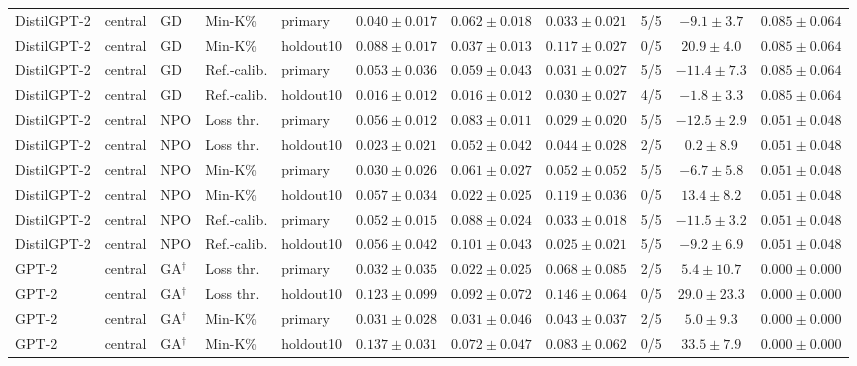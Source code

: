 \begin{table}[t]
\begin{tabular*}{\textwidth}{@{\extracolsep{\fill}}lllllcccccc@{}}
DistilGPT-2 & central & GD & Min-K\% & primary & $0.040 \pm 0.017$ & $0.062 \pm 0.018$ & $0.033 \pm 0.021$ & 5/5 & $-9.1 \pm 3.7$ & $0.085 \pm 0.064$ \\
DistilGPT-2 & central & GD & Min-K\% & holdout10 & $0.088 \pm 0.017$ & $0.037 \pm 0.013$ & $0.117 \pm 0.027$ & 0/5 & $20.9 \pm 4.0$ & $0.085 \pm 0.064$ \\
DistilGPT-2 & central & GD & Ref.-calib. & primary & $0.053 \pm 0.036$ & $0.059 \pm 0.043$ & $0.031 \pm 0.027$ & 5/5 & $-11.4 \pm 7.3$ & $0.085 \pm 0.064$ \\
DistilGPT-2 & central & GD & Ref.-calib. & holdout10 & $0.016 \pm 0.012$ & $0.016 \pm 0.012$ & $0.030 \pm 0.027$ & 4/5 & $-1.8 \pm 3.3$ & $0.085 \pm 0.064$ \\
DistilGPT-2 & central & NPO & Loss thr. & primary & $0.056 \pm 0.012$ & $0.083 \pm 0.011$ & $0.029 \pm 0.020$ & 5/5 & $-12.5 \pm 2.9$ & $0.051 \pm 0.048$ \\
DistilGPT-2 & central & NPO & Loss thr. & holdout10 & $0.023 \pm 0.021$ & $0.052 \pm 0.042$ & $0.044 \pm 0.028$ & 2/5 & $0.2 \pm 8.9$ & $0.051 \pm 0.048$ \\
DistilGPT-2 & central & NPO & Min-K\% & primary & $0.030 \pm 0.026$ & $0.061 \pm 0.027$ & $0.052 \pm 0.052$ & 5/5 & $-6.7 \pm 5.8$ & $0.051 \pm 0.048$ \\
DistilGPT-2 & central & NPO & Min-K\% & holdout10 & $0.057 \pm 0.034$ & $0.022 \pm 0.025$ & $0.119 \pm 0.036$ & 0/5 & $13.4 \pm 8.2$ & $0.051 \pm 0.048$ \\
DistilGPT-2 & central & NPO & Ref.-calib. & primary & $0.052 \pm 0.015$ & $0.088 \pm 0.024$ & $0.033 \pm 0.018$ & 5/5 & $-11.5 \pm 3.2$ & $0.051 \pm 0.048$ \\
DistilGPT-2 & central & NPO & Ref.-calib. & holdout10 & $0.056 \pm 0.042$ & $0.101 \pm 0.043$ & $0.025 \pm 0.021$ & 5/5 & $-9.2 \pm 6.9$ & $0.051 \pm 0.048$ \\
GPT-2 & central & GA$^{\dagger}$ & Loss thr. & primary & $0.032 \pm 0.035$ & $0.022 \pm 0.025$ & $0.068 \pm 0.085$ & 2/5 & $5.4 \pm 10.7$ & $0.000 \pm 0.000$ \\
GPT-2 & central & GA$^{\dagger}$ & Loss thr. & holdout10 & $0.123 \pm 0.099$ & $0.092 \pm 0.072$ & $0.146 \pm 0.064$ & 0/5 & $29.0 \pm 23.3$ & $0.000 \pm 0.000$ \\
GPT-2 & central & GA$^{\dagger}$ & Min-K\% & primary & $0.031 \pm 0.028$ & $0.031 \pm 0.046$ & $0.043 \pm 0.037$ & 2/5 & $5.0 \pm 9.3$ & $0.000 \pm 0.000$ \\
GPT-2 & central & GA$^{\dagger}$ & Min-K\% & holdout10 & $0.137 \pm 0.031$ & $0.072 \pm 0.047$ & $0.083 \pm 0.062$ & 0/5 & $33.5 \pm 7.9$ & $0.000 \pm 0.000$ \\

\end{tabular*}
\end{table}
